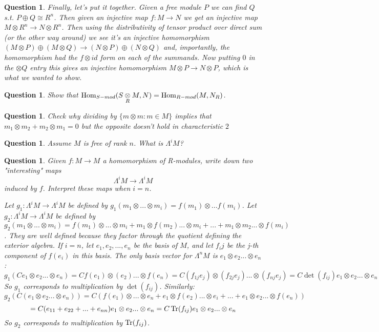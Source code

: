 \documentclass[a4paper]{article}
\newtheorem{que}[thm]{Question}
\begin{document}
\begin{que}
Finally, let's put it together. Given a free module $P$ we can find $Q$ s.t. $P\oplus Q\cong R^{n}$. Then given an injective map $f:M\to N$ we get an injective map $M\otimes R^{n}\to N\otimes R^{n}$. Then using the distributivity of tensor product over direct sum (or the other way around) we see it's an injective homomorphism $\left( M\otimes P \right) \oplus \left( M\otimes Q \right) \to \left( N\otimes P \right) \oplus \left( N\otimes Q \right) $ and, importantly, the homomorphism had the $f\otimes id$ form on each of the summands. Now putting $0$ in the $\otimes Q$ entry this gives an injective homomorphism $M\otimes P\to N\otimes P$, which is what we wanted to show.
\end{que}
\begin{que} Show that $\operatorname{Hom}_{S-mod}(S \mathbin{\mathop{\otimes}\limits_{R}} M, N) = \operatorname{Hom}_{R-mod}(M, N_R)$.
\end{que}
\begin{que} Check why dividing by $\{m \otimes m : m \in M\}$ implies that $m_1 \otimes m_2 + m_2 \otimes m_1 = 0$ but the opposite doesn't hold in characteristic $2$
\end{que}
\begin{que} Assume $M$ is free of rank $n$. What is $\Lambda^i M$?

\end{que}
\begin{que} Given $f : M \to M$ a homomorphism of R-modules, write down two "interesting" maps
$$\Lambda^i M \to \Lambda^i M$$ induced by $f$. Interpret these maps when $i=n$.

Let $g_1 : \Lambda^i M \to \Lambda^i M$ be defined by $g_1(m_1 \otimes ... \otimes m_i) = f(m_1) \otimes ... f(m_i)$. 
Let $g_2 : \Lambda^i M \to \Lambda^i M$ be defined by $g_2(m_1 \otimes ... \otimes m_i) = f(m_1) \otimes ... \otimes m_i + m_1 \otimes f(m_2) ... \otimes m_i + ... + m_1 \otimes m_2 ... \otimes f(m_i)$. They are well defined because they factor through the quotient defining the exterior algebra.
If $i=n$, let $e_1, e_2, ..., e_n$ be the basis of $M$, and let $f_ij$ be the j-th component of $f(e_i)$ in this basis. The only basis vector for $\Lambda^n M$ is $e_1 \otimes e_2 ... \otimes e_n$:
$$g_1(C e_1 \otimes e_2 ... \otimes e_n) = C f(e_1) \otimes (e_2) ... \otimes f(e_n) = C (f_{1j}e_j) \otimes (f_{2j}e_j) ... \otimes (f_{nj}e_j) = C \det(f_{ij})  e_1 \otimes e_2 ... \otimes e_n$$
So $g_1$ corresponds to multiplication by $\det(f_{ij})$.
Similarly:
$$g_2(C( e_1 \otimes e_2 ... \otimes e_n)) = C(f(e_1) \otimes ... \otimes e_n + e_1 \otimes f(e_2) ... \otimes e_i + ... + e_1 \otimes e_2 ... \otimes f(e_n))$$
$$ = C(e_{11} + e_{22}+...+e_{nn}) e_1 \otimes e_2 ... \otimes e_n = C \operatorname{Tr}(f_{ij}) e_1 \otimes e_2 ... \otimes e_n$$
So $g_2$ corresponds to multiplication by $\operatorname{Tr}(f_{ij})$.
\end{que}
\end{document}
